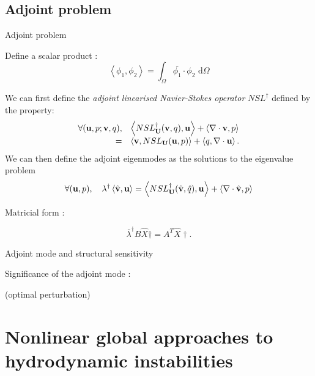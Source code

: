 \documentclass{beamer}
\newcommand{\be}[1]{ \begin{equation} \label{#1}}
\newcommand{\ee}{\end{equation}}
\newcommand{\bes}[1]{ \begin{equation} \label{#1}\begin{array}{rl}}
\newcommand{\ees}{\end{array}\end{equation}}
\begin{document}
\subsection{Adjoint problem} 

\begin{frame}{Adjoint problem}

\small

Define a scalar product :
$$
\left< \phi_1, \phi_2 \right> = \int_\Omega \overline{\phi_1} \cdot \phi_2   \mbox{ d} \Omega
$$


We can first define the {\em adjoint linearised Navier-Stokes operator} $NSL^\dag$ defined by the property:
\bes{NSLAdj}
\forall ( {\bf u}, p ; {\bf v}, q), & \left< NSL^\dag_{\bf U}( {\bf v},q) ,{\bf u}\right> + \left< \nabla \cdot {\bf v},p\right>  \\
=& \left< {\bf v}, NSL_{\bf U} ({\bf u},p)\right> + \left< q, \nabla \cdot {\bf u}\right>.
\ees
We can then define the adjoint eigenmodes as the solutions to the eigenvalue problem 
\be{EigenAdj} 
\forall ( {\bf u}, p), \quad  \lambda^\dag \left< \hat{\bf v}, {\bf u}\right> =
 \left< NSL^\dag_{\bf U}( \hat{\bf v},\hat{q}) ,{\bf u}\right> + \left< \nabla \cdot \hat{\bf v},p\right>  
\ee

Matricial form :

\be{Eigen_Adj_matricial}
\overline{\lambda}^\dag B \hat{X}\dag = A^T \hat{X}\dag.
\ee


\end{frame}

\begin{frame}{Adjoint mode and structural sensitivity}


Significance of the adjoint mode : 

(optimal perturbation)


\end{frame}




\section{Nonlinear global approaches to hydrodynamic instabilities}
\end{document}
